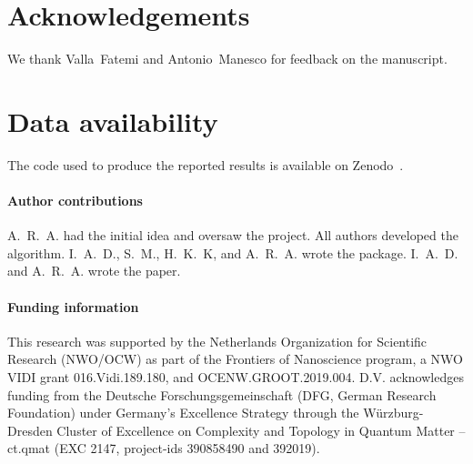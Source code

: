 \section*{Acknowledgements}
We thank Valla~Fatemi and Antonio~Manesco for feedback on the manuscript.

\section*{Data availability}
The code used to produce the reported results is available on Zenodo~\cite{Araya_2024}.

\paragraph{Author contributions}
A.~R.~A. had the initial idea and oversaw the project.
All authors developed the algorithm.
I.~A.~D., S.~M., H.~K.~K, and A.~R.~A. wrote the package.
I.~A.~D. and A.~R.~A. wrote the paper.

\paragraph{Funding information}
This research was supported by the Netherlands Organization for Scientific Research (NWO/OCW) as part of the Frontiers of Nanoscience program, a NWO VIDI grant 016.Vidi.189.180, and OCENW.GROOT.2019.004.
D.V. acknowledges funding from the Deutsche Forschungsgemeinschaft (DFG, German Research Foundation) under Germany’s Excellence Strategy through the W\"{u}rzburg-Dresden Cluster of Excellence on Complexity and
Topology in Quantum Matter – ct.qmat (EXC 2147, project-ids 390858490 and 392019).
